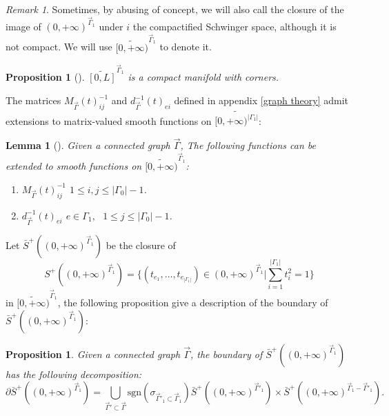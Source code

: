 \documentclass[11pt]{amsart}
\newtheorem{lem}[thm]{Lemma}
\newtheorem{prop}[thm]{Proposition}
\theoremstyle{definition}
\theoremstyle{remark}
\newtheorem{rem}[thm]{Remark}
\numberwithin{equation}{section}
\begin{document}
\begin{rem}
  Sometimes, by abusing of concept, we will also call the closure of the image
  of $(0, + \infty)^{\vec{\Gamma}_1 }$ under $i$ the compactified Schwinger
  space, although it is not compact. We will use $\widetilde{[0, + \infty)}^{\vec{\Gamma}_1}$ to denote it.
\end{rem}

\begin{prop}[\cite{Ammann2019ACO}]
  $\widetilde{[0, L]}^{\vec{\Gamma}_1}$ is a compact manifold with corners.
\end{prop}

The matrices $M_{\vec{\Gamma}} (t)^{- 1}_{i j}$ and $d^{-1}_{\vec{\Gamma}}(t)_{ei}$
defined in appendix \ref{graph theory} admit extensions to matrix-valued smooth functions on
$\widetilde{[0, + \infty)^{| \Gamma_1 |}}$:

\begin{lem}[\cite{wang2024feynman}]
  \label{extended functions}Given a connected graph $\vec{\Gamma}$, The following functions can be extended to smooth functions on
  $\widetilde{[0, + \infty)}^{ \vec{\Gamma}_1 }$:
  \begin{enumerate}
    \item $M_{\vec{\Gamma}} (t)^{- 1}_{i j}$  $1 \leqslant i, j \leqslant |
    \Gamma_0 | - 1$.
    
    \item $d^{-1}_{\vec{\Gamma}}(t)_{ei}$  $e \in \Gamma_1, \text{ } 1
    \leqslant j \leqslant | \Gamma_0 | - 1$.
  \end{enumerate}
\end{lem}

Let $\bar{S}^{+}((0,+\infty)^{\vec{\Gamma}_{1}})$ be the closure of 
$$
    S^{+}((0,+\infty)^{\vec{\Gamma}_{1}})=\{(t_{e_{1}},\dots,t_{e_{|\Gamma_{1}|}})\in(0,+\infty)^{\vec{\Gamma}_{1}}|\sum_{i=1}^{|\Gamma_{1}|}t_{i}^{2}=1\}
$$in $\widetilde{[0,+\infty)}^{\vec{\Gamma}_{1}}$, the following proposition give a description of the boundary of $\bar{S}^{+}((0,+\infty)^{\vec{\Gamma}_{1}})$:

\begin{prop}
  \label{boundary description}Given a connected graph $\vec{\Gamma}$, the boundary of
  $\bar{S}^{+}((0,+\infty)^{\vec{\Gamma}_{1}})$ has the following decomposition:
  \[ \partial \bar{S}^{+}((0,+\infty)^{\vec{\Gamma}_{1}}) = \bigcup_{\vec{\Gamma}'
       \subset \vec{\Gamma}} \mathrm{sgn}(\sigma_{\vec{\Gamma}'_{1}\subset \vec{\Gamma}_{1}})
       \bar{S}^{+}((0,+\infty)^{\vec{\Gamma}'_{1}}) \times
       \bar{S}^{+}((0,+\infty)^{\vec{\Gamma}_{1}- \vec{\Gamma}'_{1}}). \]
\end{prop}
\end{document}
